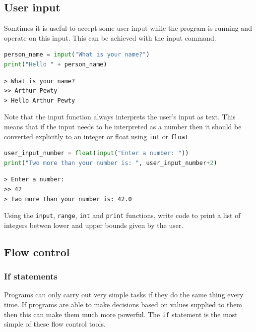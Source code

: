 	\subsection{User input}
		Somtimes it is useful to accept some user input while the program is running and operate on this input. This can be achieved with the input command.
		\begin{lstlisting}[language=Python]
person_name = input("What is your name?")
print("Hello " + person_name)\end{lstlisting}
		\begin{verbatim}
> What is your name?
>> Arthur Pewty
> Hello Arthur Pewty\end{verbatim}
		Note that the input function always interprets the user's input as text. This means that if the input needs to be interpreted as a number then it should be converted explicitly to an integer or float using \texttt{int} or \texttt{float}
		\begin{lstlisting}[language=Python]
user_input_number = float(input("Enter a number: "))
print("Two more than your number is: ", user_input_number+2)\end{lstlisting}
		\begin{verbatim}
> Enter a number: 
>> 42
> Two more than your number is: 42.0\end{verbatim}
\begin{task}Using the \texttt{input}, \texttt{range}, \texttt{int} and \texttt{print} functions, write code to print a list of integers betwen lower and upper bounds given by the user.\end{task}
	\subsection{Flow control}
		\subsubsection{If statements}
		Programs can only carry out very simple tasks if they do the same thing every time. If programs are able to make decisions based on values supplied to them then this can make them much more powerful. The \texttt{if} statement is the most simple of these flow control tools.
		
